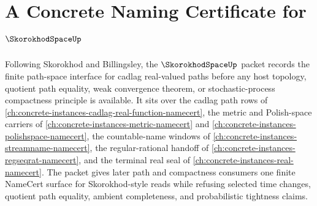 \chapter{A Concrete Naming Certificate for $\SkorokhodSpaceUp$}
\label{ch:concrete-instances-skorokhod-space-namecert}

Following Skorokhod and Billingsley, the $\SkorokhodSpaceUp$ packet records the finite path-space interface for cadlag real-valued paths before any host topology, quotient path equality, weak convergence theorem, or stochastic-process compactness principle is available. It sits over the cadlag path rows of \autoref{ch:concrete-instances-cadlag-real-function-namecert}, the metric and Polish-space carriers of \autoref{ch:concrete-instances-metric-namecert} and \autoref{ch:concrete-instances-polishspace-namecert}, the countable-name windows of \autoref{ch:concrete-instances-streamname-namecert}, the regular-rational handoff of \autoref{ch:concrete-instances-regseqrat-namecert}, and the terminal real seal of \autoref{ch:concrete-instances-real-namecert}. The packet gives later path and compactness consumers one finite NameCert surface for Skorokhod-style reads while refusing selected time changes, quotient path equality, ambient completeness, and probabilistic tightness claims.

